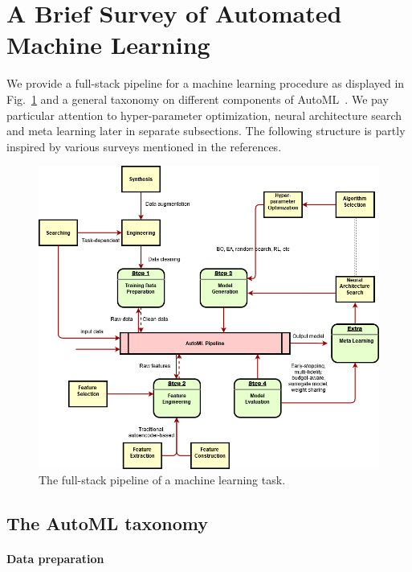 \section{A Brief Survey of Automated Machine Learning}\label{sec:dttts.survey}

We provide a full-stack pipeline for a machine learning procedure as displayed in Fig.~\ref{fig:automl} and a general taxonomy on different components of AutoML~\citep{hutter2019automl,zoller2019automl,he2019automl}. We pay particular attention to hyper-parameter optimization, neural architecture search and meta learning later in separate subsections. The following structure is partly inspired by various surveys mentioned in the references.

\begin{figure}[ht]
    \centering
    \includegraphics[width=\textwidth]{Chapter6/img/automl.png}
    \caption{The full-stack pipeline of a machine learning task.}
    \label{fig:automl}
\end{figure}


\subsection{The AutoML taxonomy}\label{sec:dttts.survey.taxonomy}

\paragraph{Data preparation}

